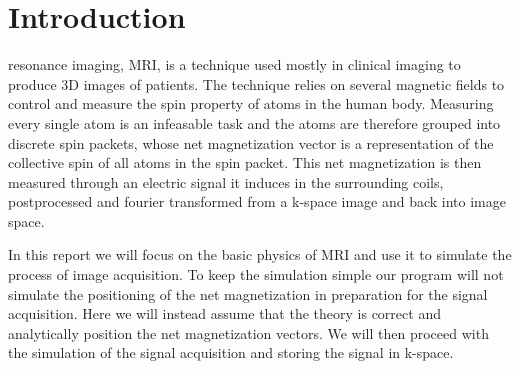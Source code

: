 


\section{Introduction}


 resonance imaging, MRI, is a technique used
mostly in clinical imaging to produce 3D images of patients. The
technique relies on several magnetic fields to control and measure the
spin property of atoms in the human body. Measuring every single atom
is an infeasable task and the atoms are therefore grouped into
discrete spin packets, whose net magnetization vector is a
representation of the collective spin of all atoms in the spin
packet. This net magnetization is then measured through an electric
signal it induces in the surrounding coils, postprocessed and fourier
transformed from a k-space image and back into image space.


In this report we will focus on the basic physics of MRI and use it to
simulate the process of image acquisition. To keep the simulation
simple our program will not simulate the positioning of the net
magnetization in preparation for the signal acquisition. Here we will
instead assume that the theory is correct and analytically position
the net magnetization vectors. We will then proceed with the
simulation of the signal acquisition and storing the signal in
k-space.

